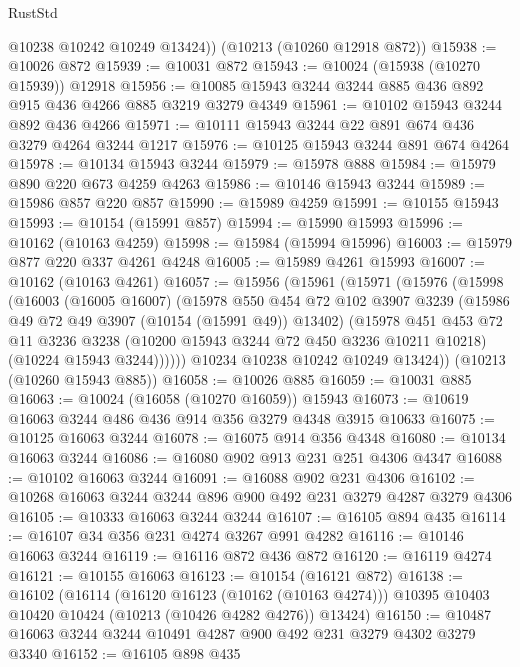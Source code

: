 \begin{lexlean}{RustStd}
\begin{coremodule}
{\begin{coremodule}
{{{{{{{{{{{{{{{{{{{{{{{{{{        @10238
        @10242
        @10249
        @13424))
    (@10213 (@10260 @12918 @872))
@15938 := @10026 @872
@15939 := @10031 @872
@15943 := @10024 (@15938 (@10270 @15939)) @12918
@15956 := @10085 @15943 @3244 @3244 @885 @436 @892 @915 @436 @4266 @885 @3219 @3279 @4349
@15961 := @10102 @15943 @3244 @892 @436 @4266
@15971 := @10111 @15943 @3244 @22 @891 @674 @436 @3279 @4264 @3244 @1217
@15976 := @10125 @15943 @3244 @891 @674 @4264
@15978 := @10134 @15943 @3244
@15979 := @15978 @888
@15984 := @15979 @890 @220 @673 @4259 @4263
@15986 := @10146 @15943 @3244
@15989 := @15986 @857 @220 @857
@15990 := @15989 @4259
@15991 := @10155 @15943
@15993 := @10154 (@15991 @857)
@15994 := @15990 @15993
@15996 := @10162 (@10163 @4259)
@15998 := @15984 (@15994 @15996)
@16003 := @15979 @877 @220 @337 @4261 @4248
@16005 := @15989 @4261 @15993
@16007 := @10162 (@10163 @4261)
@16057 := @15956
    (@15961
      (@15971
        (@15976
          (@15998
            (@16003
              (@16005 @16007)
              (@15978
                @550
                @454
                @72
                @102
                @3907
                @3239
                (@15986 @49 @72 @49 @3907 (@10154 (@15991 @49)) @13402)
                (@15978
                  @451
                  @453
                  @72
                  @11
                  @3236
                  @3238
                  (@10200 @15943 @3244 @72 @450 @3236 @10211 @10218)
                  (@10224 @15943 @3244))))))
        @10234
        @10238
        @10242
        @10249
        @13424))
    (@10213 (@10260 @15943 @885))
@16058 := @10026 @885
@16059 := @10031 @885
@16063 := @10024 (@16058 (@10270 @16059)) @15943
@16073 := @10619 @16063 @3244 @486 @436 @914 @356 @3279 @4348 @3915 @10633
@16075 := @10125 @16063 @3244
@16078 := @16075 @914 @356 @4348
@16080 := @10134 @16063 @3244
@16086 := @16080 @902 @913 @231 @251 @4306 @4347
@16088 := @10102 @16063 @3244
@16091 := @16088 @902 @231 @4306
@16102 := @10268 @16063 @3244 @3244 @896 @900 @492 @231 @3279 @4287 @3279 @4306
@16105 := @10333 @16063 @3244 @3244
@16107 := @16105 @894 @435
@16114 := @16107 @34 @356 @231 @4274 @3267 @991 @4282
@16116 := @10146 @16063 @3244
@16119 := @16116 @872 @436 @872
@16120 := @16119 @4274
@16121 := @10155 @16063
@16123 := @10154 (@16121 @872)
@16138 := @16102
    (@16114
      (@16120 @16123 (@10162 (@10163 @4274)))
      @10395
      @10403
      @10420
      @10424
      (@10213 (@10426 @4282 @4276))
      @13424)
@16150 := @10487 @16063 @3244 @3244 @10491 @4287 @900 @492 @231 @3279 @4302 @3279 @3340
@16152 := @16105 @898 @435
}}}}}}}}}}}}}}}}}}}}}}}}}}
\end{coremodule}}
\end{coremodule}
\end{lexlean}
